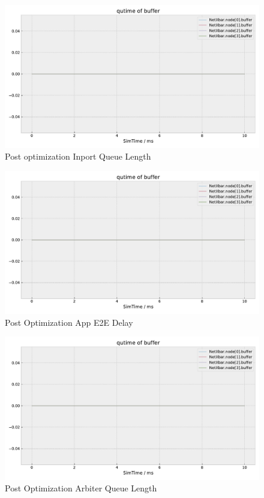 \documentclass[]{scrartcl}
\begin{document}
\begin{figure}[H]
    \centering
    \includegraphics[width=\columnwidth, page=2]{../../python/results/postopt-General-0}
    \caption{Post optimization Inport Queue Length}%
    \label{fig:postopt-inport-qlen}
\end{figure}
\begin{figure}[H]
    \centering
    \includegraphics[width=\columnwidth, page=8]{../../python/results/postopt-General-0}
    \caption{Post Optimization App E2E Delay}%
    \label{fig:postopt-app-e2e}
\end{figure}
\begin{figure}[H]
    \centering
    \includegraphics[width=\columnwidth, page=4]{../../python/results/postopt-General-0}
    \caption{Post Optimization Arbiter Queue Length}%
    \label{fig:postopt-arbiter-qlen}
\end{figure}
\end{document}
